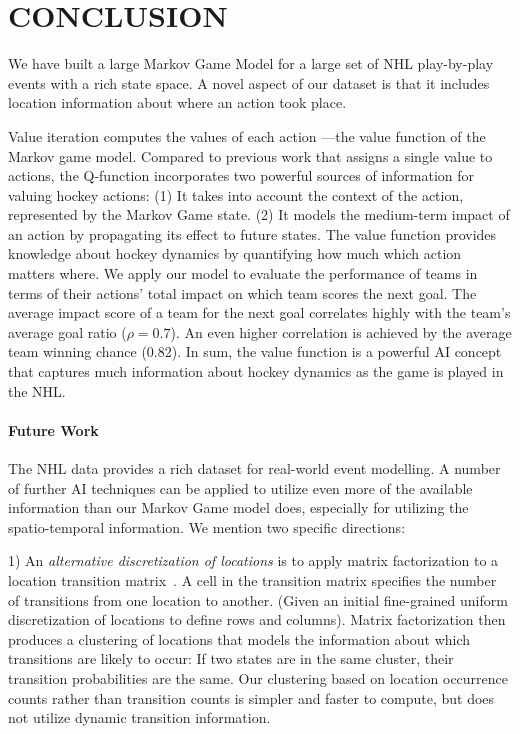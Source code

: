 \section{CONCLUSION}

We have built  a large Markov Game Model for a large set of NHL play-by-play events with a rich state space. A novel aspect of our dataset is that it includes location information about where an action took place. 

Value iteration computes the values of each action ---the value function of the Markov game model. Compared to previous work that assigns a single value to actions, the Q-function incorporates two powerful sources of information for valuing hockey actions: (1) It takes into account the context of the action, represented by the Markov Game state. (2) It models the medium-term impact of an action by propagating its effect to future states. The value function provides knowledge about hockey dynamics by quantifying how much which action matters where.
%
We apply our model to evaluate the performance of teams in terms of their actions' total impact on which team scores the next goal.
The average impact score of a team for the next goal correlates highly with the team's average goal ratio ($\rho = 0.7$). An even higher correlation is achieved by the average team winning chance (0.82). 
In sum, the  value function is a powerful AI concept that captures much information about hockey dynamics as the game is played in the NHL.

\paragraph{Future Work} The NHL data provides a rich dataset for real-world event modelling. A number of further AI techniques can be applied to utilize even more of the available information than our Markov Game model does, especially for utilizing the spatio-temporal information. We mention two specific directions:

1) An {\em alternative discretization of locations} is to apply matrix factorization to a location transition matrix~\citep{Cervone2014a}. A cell in the transition matrix specifies the number of transitions from one location to another. (Given an initial fine-grained uniform discretization of locations to define rows and columns). Matrix factorization then produces a clustering of locations that models the information about which transitions are likely to occur: If two states are in the same cluster, their transition probabilities are the same. Our clustering based on location occurrence counts rather than transition counts is simpler and faster to compute, but does not utilize dynamic transition information.

